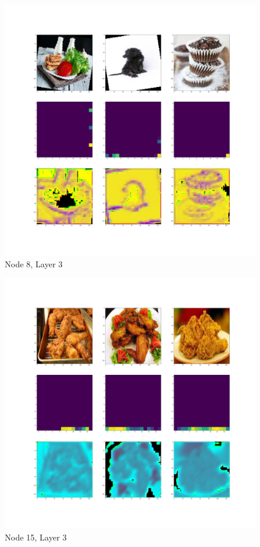 \documentclass[12pt]{article}
\begin{document}
\begin{figure}[H]
	\centering
	\includegraphics[width=0.7\linewidth]{../diagrams/node8_layer3_DMF}
	\caption{Node 8, Layer 3}
	\label{fig:node8layer3dmf}
\end{figure}
\begin{figure}[H]
	\centering
	\includegraphics[width=0.7\linewidth]{../diagrams/node15_layer3_DMF}
	\caption{Node 15, Layer 3}
	\label{fig:node15layer3dmf}
\end{figure}
\end{document}
